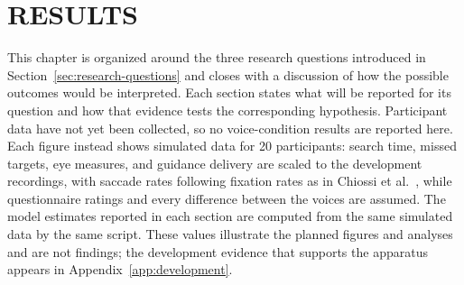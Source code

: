 \chapter{RESULTS}
\label{ch:evaluation}

This chapter is organized around the three research questions introduced in Section~\ref{sec:research-questions} and closes with a discussion of how the possible outcomes would be interpreted. Each section states what will be reported for its question and how that evidence tests the corresponding hypothesis. Participant data have not yet been collected, so no voice-condition results are reported here. Each figure instead shows simulated data for 20 participants: search time, missed targets, eye measures, and guidance delivery are scaled to the development recordings, with saccade rates following fixation rates as in Chiossi et al.~\cite{chiossi2024searching}, while questionnaire ratings and every difference between the voices are assumed. The model estimates reported in each section are computed from the same simulated data by the same script. These values illustrate the planned figures and analyses and are not findings; the development evidence that supports the apparatus appears in Appendix~\ref{app:development}.

